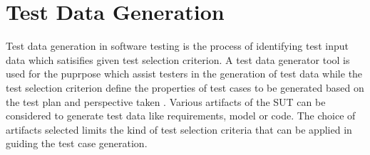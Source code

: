 




\section{Test Data Generation}
Test data generation in software testing is the process of identifying test input data which satisifies given test selection criterion. A test data generator tool is used for the puprpose which assist testers in the generation of test data while the test selection criterion define the properties of test cases to be generated based on the test plan and perspective taken \cite{korel1990}. Various artifacts of the SUT can be considered to generate test data like requirements, model or code. The choice of artifacts selected limits the kind of test selection criteria that can be applied in guiding the test case generation. 

